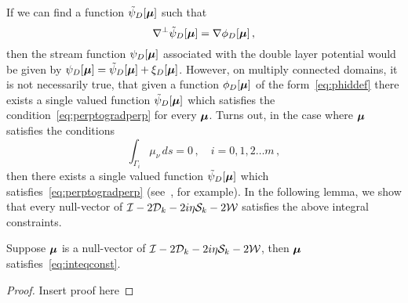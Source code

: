 If we can find a function $\tilde{\psi}_{D}[{\boldsymbol \mu}]$ such
that 
\begin{equation}
\label{eq:perptogradperp}
\nabla^{\perp} \tilde{\psi}_{D}[{\boldsymbol \mu}] = \nabla \phi_{D} [{\boldsymbol \mu}] \, ,
\end{equation}
then the stream function $\psi_{D}[{\boldsymbol \mu}]$ 
associated with the double layer potential would
be given by $\psi_{D}[{\boldsymbol \mu}] = \tilde{\psi}_{D}[{\boldsymbol \mu}] + \xi_{D}[{\boldsymbol \mu}]$.
However, on multiply connected domains, it is not necessarily true, 
that given a function $\phi_{D}[{\boldsymbol \mu}]$ of the form~\cref{eq:phiddef} 
there exists a single valued function $\tilde{\psi}_{D}[{\boldsymbol \mu}]$ 
which satisfies the condition~\cref{eq:perptogradperp} for
every ${\boldsymbol \mu}$.
Turns out, in the case where ${\boldsymbol \mu}$ satisfies the conditions
\begin{equation}
\label{eq:inteqconst}
\int_{\Gamma_{i}} \mu_{\nu} \, ds = 0 \, ,\quad i=0,1,2\ldots m \, ,
\end{equation}
then there exists a single valued function $\tilde{\psi}_{D}[{\boldsymbol \mu}]$
which satisfies~\cref{eq:perptogradperp} (see~\cite{rachh2015integral}, 
for example).
In the following lemma, we show that every null-vector of 
$\mathcal I - 2{\mathcal D}_{k} -2i \eta {\mathcal S}_{k} - 2{\mathcal W}$ satisfies the above integral
constraints.

\begin{lem}
Suppose ${\boldsymbol \mu}$ is a null-vector of 
$\mathcal I - 2{\mathcal D}_{k} - 2i \eta {\mathcal S}_{k} -2{\mathcal W}$, then
${\boldsymbol \mu}$ satisfies~\cref{eq:inteqconst}.
\end{lem}
\begin{proof}
Insert proof here
\end{proof}
